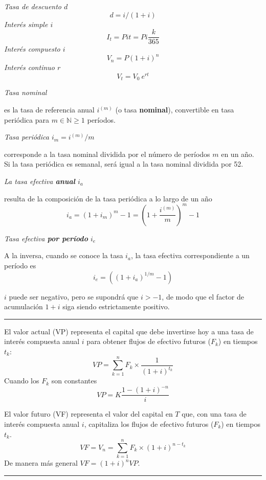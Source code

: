 \begin{f}[Intereses]

\emph{Tasa de descuento \(d\)}
     \[d=i/(1+i)\]
\emph{Interés simple \(i\)}
\[
I_t=P i t=P i \frac{k}{365}
\]
\emph{Interés compuesto \(i\)}
\[
V_n=P(1+i)^n%
\]
\emph{Interés continuo \(r\)}
\[V_t=V_0\ e^{rt}\]

\emph{Tasa nominal}

es la tasa de referencia anual \(i^{(m)}\) (o tasa \textbf{nominal}), convertible en tasa periódica para \(m\in \mathbb{N} \geq 1\) períodos.
\smallskip

\emph{Tasa periódica \(i_m=i^{(m)}/m\)}

corresponde a la tasa nominal dividida por el número de períodos \(m\) en un año.
Si la tasa periódica es semanal, será igual a la tasa nominal dividida por 52.
\smallskip

\emph{La tasa efectiva \textbf{anual} \(i_a\)}

resulta de la composición de la tasa periódica a lo largo de un año
\[
i_a=\left( 1+i_m\right)^{m}-1=\left( 1+\frac{i^{(m)}}{m}\right)^{m}-1
\]

\emph{Tasa efectiva \textbf{por período} \(i_e\)}

A la inversa, cuando se conoce la tasa \(i_a\), la tasa efectiva correspondiente a un período es 
\[
i_e=\left( (1+i_a)^{1 / m}-1\right) 
\]

\(i\) puede ser negativo, pero se supondrá que \(i>-1\), de modo que el factor de acumulación \(1+i\) siga siendo estrictamente positivo.
\end{f}
\hrule

\begin{f}

El valor actual (VP) representa el capital que debe invertirse hoy a una tasa de interés compuesta anual \(i\) para obtener flujos de efectivo futuros (\(F_k\)) en tiempos \(t_k\):
\begin{equation}
	VP = \sum_{k=1}^{n} F_k \times \frac{1}{(1+i)^{t_k}}
\label{ValeurActuelle}
\end{equation}
Cuando los \(F_k\) son constantes
\begin{equation}
	VP = K  \frac{1 - (1+i)^{-n}} {i}
\label{ValeurActuelleFluxCt}
\end{equation}

El valor futuro (VF) representa el valor del capital en \(T\) que, con una tasa de interés compuesta anual \(i\), capitaliza los flujos de efectivo futuros (\(F_k\)) en tiempos \(t_k\).
\begin{equation}
	VF=V_n = \sum_{k=1}^{n} F_k \times (1+i)^{n-t_k}
\end{equation}
De manera más general \(VF= (1+i)^{n}VP\).
\end{f}
\hrule

